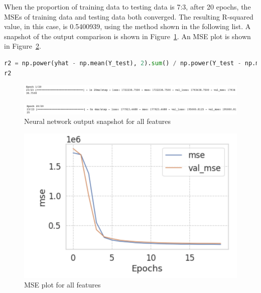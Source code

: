 \documentclass{scrartcl}
\begin{document}
\noindent When the proportion of training data to testing data is 7:3, after 20 epochs, the MSEs of training data and testing data both converged. The resulting R-squared value, in this case, is 0.5400939, using the method shown in the following list. A snapshot of the output comparison is shown in Figure~\ref{fig:NN7-8}. An MSE plot is shown in Figure~\ref{fig:net}. \\

\begin{lstlisting}[language=Python, caption= R-Squared output code, basicstyle=\tiny,captionpos=b]
r2 = np.power(yhat - np.mean(Y_test), 2).sum() / np.power(Y_test - np.mean(Y_test), 2).sum()
r2

\end{lstlisting}

\begin{figure}[H]
         \centering
         \includegraphics[width=\textwidth]{Graphics/Neural Network Images/NN7.png}
\end{figure}
     
\begin{figure}[H]
         \centering
         \includegraphics[width=\textwidth]{Graphics/Neural Network Images/NN8.png}
         \caption{Neural network output snapshot for all features}
         \label{fig:NN7-8}
\end{figure}


\begin{figure}[H]
	\begin{center}
		\includegraphics[scale=1.0]{Graphics/Neural Network Images/NN6.png}
	\end{center}
	\caption{MSE plot for all features}
	\label{fig:net}
\end{figure}
\end{document}
